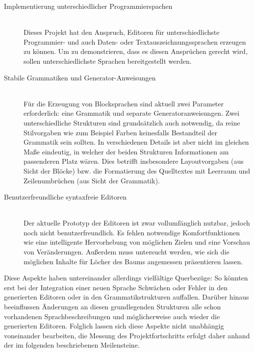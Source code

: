 \documentclass[paper=a4,fontsize=11pt,parskip=half]{scrartcl}
\begin{document}
\begin{description}
\item[Implementierung unterschiedlicher Programmierspachen] \hfill\\
  Dieses Projekt hat den Anspruch, Editoren für unterschiedlichste Programmier- und auch Daten- oder Textauszeichnungssprachen erzeugen zu können. Um zu demonstrieren, dass es diesen Ansprüchen gerecht wird, sollen unterschiedlichste Sprachen bereitgestellt werden.

\item[Stabile Grammatiken und Generator-Anweisungen] \hfill\\
  Für die Erzeugung von Blocksprachen sind aktuell zwei Parameter erforderlich: eine Grammatik und separate Generatoranweisungen. Zwei unterschiedliche Strukturen sind grundsätzlich auch notwendig, da reine Stilvorgaben wie zum Beispiel Farben keinesfalls Bestandteil der Grammatik sein sollten. In verschiedenen Details ist aber nicht im gleichen Maße eindeutig, in welcher der beiden Strukturen Informationen am passenderen Platz wären. Dies betrifft insbesondere Layoutvorgaben (aus Sicht der Blöcke) bzw. die Formatierung des Quelltextes mit Leerraum und Zeilenumbrüchen (aus Sicht der Grammatik).

\item[Benutzerfreundliche syntaxfreie Editoren] \hfill\\
  Der aktuelle Prototyp der Editoren ist zwar vollumfänglich nutzbar, jedoch noch nicht benutzerfreundlich. Es fehlen notwendige Komfortfunktionen wie eine intelligente Hervorhebung von möglichen Zielen und eine Vorschau von Veränderungen. Außerdem muss untersucht werden, wie sich die möglichen Inhalte für Löcher des Baums angemessen präsentieren lassen.
\end{description}

Diese Aspekte haben untereinander allerdings vielfältige Querbezüge: So könnten erst bei der Integration einer neuen Sprache Schwächen oder Fehler in den generierten Editoren oder in den Grammatikstrukturen auffallen. Darüber hinaus beeinflussen Änderungen an diesen grundlegenden Strukturen alle schon vorhandenen Sprachbeschreibungen und möglicherweise auch wieder die generierten Editoren. Folglich lassen sich diese Aspekte nicht unabhängig voneinander bearbeiten, die Messung des Projektfortschritts erfolgt daher anhand der im folgenden beschriebenen Meilensteine.
\end{document}
